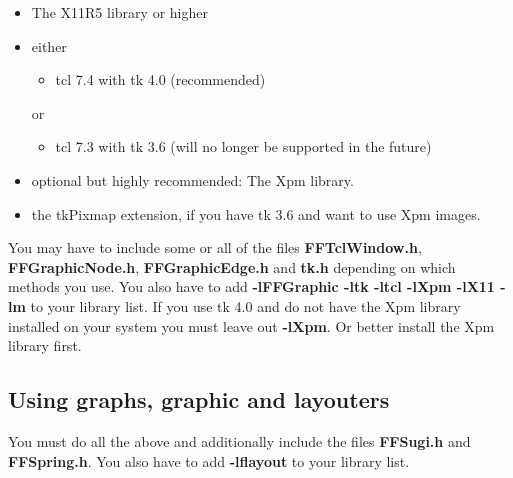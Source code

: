 \begin{itemize}

\item
The X11R5 library or higher

\item
either

\begin{itemize}

\item
tcl 7.4 with tk 4.0 (recommended)

\end{itemize}

or

\begin{itemize}

\item
tcl 7.3 with tk 3.6 (will no longer be supported in the future)

\end{itemize}

\item optional but highly recommended: The Xpm library. 

\item the tkPixmap extension, if you have tk 3.6 and want to use Xpm images.

\end{itemize}

You may have to include some or all of the files {\bf
  FFTclWindow.h}, {\bf FFGraphicNode.h}, {\bf FFGraphicEdge.h}
and {\bf tk.h} depending on which methods you use. You also have to add {\bf -lFFGraphic -ltk -ltcl
  -lXpm -lX11 -lm} to your library list.  If you use tk 4.0 and
do not have the Xpm library installed on your system you must
leave out {\bf -lXpm}. Or better install the Xpm library first.

\subsection{Using graphs, graphic and layouters}
\label{using_graph_graphic_and_layouters}

You must do all the above and additionally include the files {\bf
  FFSugi.h} and {\bf FFSpring.h}. You also have to add {\bf
  -lflayout} to your library list.

